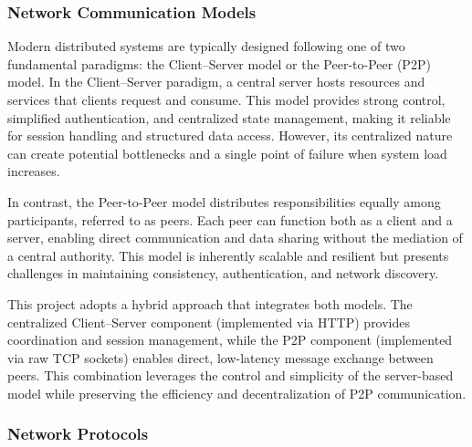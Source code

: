 \subsubsection{Network Communication Models}

Modern distributed systems are typically designed following one of two fundamental paradigms: the Client–Server model or the Peer-to-Peer (P2P) model.
In the Client–Server paradigm, a central server hosts resources and services that clients request and consume. This model provides strong control, simplified authentication, and centralized state management, making it reliable for session handling and structured data access. However, its centralized nature can create potential bottlenecks and a single point of failure when system load increases.

In contrast, the Peer-to-Peer model distributes responsibilities equally among participants, referred to as peers. Each peer can function both as a client and a server, enabling direct communication and data sharing without the mediation of a central authority. This model is inherently scalable and resilient but presents challenges in maintaining consistency, authentication, and network discovery.

This project adopts a hybrid approach that integrates both models. The centralized Client–Server component (implemented via HTTP) provides coordination and session management, while the P2P component (implemented via raw TCP sockets) enables direct, low-latency message exchange between peers. This combination leverages the control and simplicity of the server-based model while preserving the efficiency and decentralization of P2P communication.

\subsubsection{Network Protocols}

